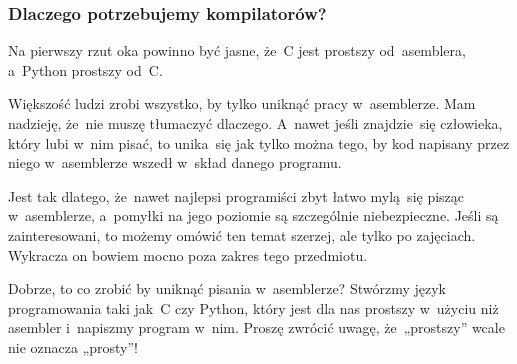 \documentclass[10pt,t]{beamer}
\begin{document}
\begin{frame}
  \frametitle{Dlaczego potrzebujemy kompilatorów?}


  Na pierwszy rzut oka powinno być jasne, że~C jest prostszy od~asemblera,
  a~Python prostszy od~C.

  Większość ludzi zrobi wszystko, by tylko uniknąć pracy w~asemblerze.
  Mam nadzieję, że~nie muszę tłumaczyć dlaczego.  A~nawet jeśli
  znajdzie~się człowieka, który lubi w~nim pisać, to unika~się jak tylko
  można tego, by kod napisany przez niego w~asemblerze wszedł w~skład
  danego programu.

  Jest tak dlatego, że~nawet najlepsi programiści zbyt łatwo mylą~się
  pisząc w~asemblerze, a~pomyłki na jego poziomie są szczególnie
  niebezpieczne. Jeśli są zainteresowani, to możemy omówić ten temat
  szerzej, ale tylko po zajęciach. Wykracza on bowiem mocno poza zakres tego
  przedmiotu.

  Dobrze, to co zrobić by uniknąć pisania w~asemblerze? Stwórzmy język
  programowania taki jak~C czy Python, który jest dla nas prostszy w~użyciu
  niż asembler i~napiszmy program w~nim. Proszę zwrócić uwagę, że~„prostszy”
  wcale nie oznacza „prosty”!

\end{frame}
\end{document}
